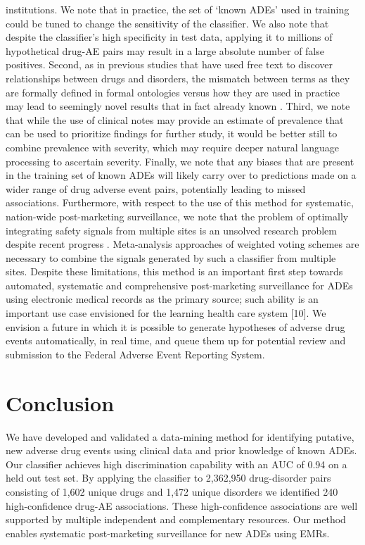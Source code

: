 institutions. We note that in practice, the set of ‘known ADEs’ used
in training could be tuned to change the sensitivity of the
classifier. We also note that despite the classifier’s high
specificity in test data, applying it to millions of hypothetical
drug-AE pairs may result in a large absolute number of false
positives. Second, as in previous studies that have used free text to
discover relationships between drugs and disorders, the mismatch
between terms as they are formally defined in formal ontologies versus
how they are used in practice may lead to seemingly novel results that
in fact already known \cite{Jung2014}. Third, we note that while the
use of clinical notes may provide an estimate of prevalence that can
be used to prioritize findings for further study, it would be better
still to combine prevalence with severity, which may require deeper
natural language processing to ascertain severity. Finally, we note
that any biases that are present in the training set of known ADEs
will likely carry over to predictions made on a wider range of drug
adverse event pairs, potentially leading to missed
associations. Furthermore, with respect to the use of this method for
systematic, nation-wide post-marketing surveillance, we note that the
problem of optimally integrating safety signals from multiple sites is
an unsolved research problem despite recent progress
\cite{Harpaz2013c}. Meta-analysis approaches of weighted voting
schemes are necessary to combine the signals generated by such a
classifier from multiple sites.  Despite these limitations, this
method is an important first step towards automated, systematic and
comprehensive post-marketing surveillance for ADEs using electronic
medical records as the primary source; such ability is an important
use case envisioned for the learning health care system [10]. We
envision a future in which it is possible to generate hypotheses of
adverse drug events automatically, in real time, and queue them up for
potential review and submission to the Federal Adverse Event Reporting
System.

\section{Conclusion}
We have developed and validated a data-mining method for identifying
putative, new adverse drug events using clinical data and prior
knowledge of known ADEs. Our classifier achieves high discrimination
capability with an AUC of 0.94 on a held out test set. By applying the
classifier to 2,362,950 drug-disorder pairs consisting of 1,602 unique
drugs and 1,472 unique disorders we identified 240 high-confidence
drug-AE associations. These high-confidence associations are well
supported by multiple independent and complementary resources. Our
method enables systematic post-marketing surveillance for new ADEs
using EMRs.

